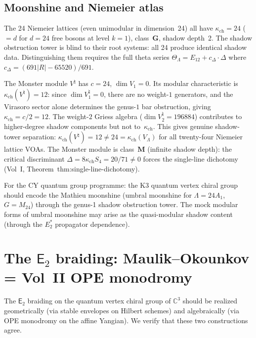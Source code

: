 \documentclass[11pt]{article}
\newcommand{\C}{\mathbb{C}}
\newcommand{\Etwo}{\mathsf{E}_2}
\begin{document}
\subsection{Moonshine and Niemeier atlas}

The 24 Niemeier lattices (even unimodular in dimension~24) all
have $\kappa_{\mathrm{ch}} = 24$ ($ = d$ for $d = 24$ free bosons at level
$k = 1$), class~$\mathbf{G}$, shadow depth~2.
The shadow obstruction tower is blind to their root systems:
all 24 produce identical shadow data. Distinguishing them
requires the full theta series
$\Theta_\Lambda = E_{12} + c_\Delta \cdot \Delta$ where
$c_\Delta = (691 |R| - 65520)/691$.

The Monster module $V^\natural$ has $c = 24$, $\dim V_1 = 0$.
Its modular characteristic is $\kappa_{\mathrm{ch}}(V^\natural) = 12$:
since $\dim V_1^\natural = 0$, there are no weight-$1$
generators, and the Virasoro sector alone determines the
genus-$1$ bar obstruction, giving $\kappa_{\mathrm{ch}} = c/2 = 12$.
The weight-$2$ Griess algebra ($\dim V_2^\natural = 196884$)
contributes to higher-degree shadow components but not to~$\kappa_{\mathrm{ch}}$.
This gives genuine shadow-tower separation:
$\kappa_{\mathrm{ch}}(V^\natural) = 12 \neq 24 = \kappa_{\mathrm{ch}}(V_\Lambda)$
for all twenty-four Niemeier lattice VOAs.
The Monster module is class~$\mathbf{M}$
(infinite shadow depth): the critical discriminant
$\Delta = 8\kappa_{\mathrm{ch}} S_4 = 20/71 \neq 0$
forces the single-line dichotomy
(Vol~I, Theorem~thm:single-line-dichotomy).

For the CY quantum group programme:
the K3 quantum vertex chiral group should encode the
Mathieu moonshine (umbral moonshine for $\Lambda = 24A_1$,
$G = M_{24}$) through the genus-1 shadow obstruction tower.
The mock modular forms of umbral moonshine may arise
as the quasi-modular shadow content
(through the $E_2^*$ propagator dependence).

\section{The $\Etwo$ braiding: Maulik--Okounkov = Vol~II OPE monodromy}
\label{sec:mo-vol2-rmatrix}

The $\Etwo$ braiding on the quantum vertex chiral group of $\C^3$
should be realized geometrically (via stable envelopes on Hilbert
schemes) and algebraically (via OPE monodromy on the affine Yangian).
We verify that these two constructions agree.
\end{document}
